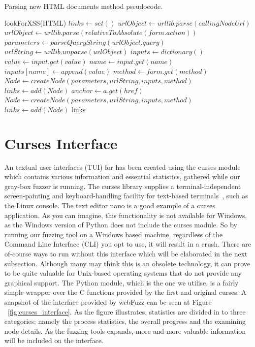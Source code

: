 \begin{algorithm}
 
 \caption{Parsing new HTML documents method pseudocode.}
 \label{alg:parser_pseudocode}
 
 \begin{algorithmic}
	\STATE lookForXSS(HTML)  
	\STATE $links \leftarrow set()$ 
 			\STATE $urlObject \leftarrow urllib.parse(callingNodeUrl)$
		 \ELSE 
 			\STATE $urlObject \leftarrow urllib.parse(relativeToAbsolute(form.action))$
		 \ENDIF
		\STATE $parameters \leftarrow parseQueryString(urlObject.query)$ 
		\STATE $urlString \leftarrow urllib.unparse(urlObject)$ 
		\STATE $inputs \leftarrow dictionary()$ 
			\STATE $value \leftarrow input.get(value)$			 
	 		\STATE $name \leftarrow input.get(name)$	
	 		\STATE $inputs[name] \leftarrow append(value)$	 
		\ENDFOR
		\STATE $method \leftarrow form.get(method)$	
		\STATE $Node \leftarrow createNode(parameters, urlString, inputs, method)$	
		\STATE $links \leftarrow add(Node)$
			\STATE $anchor \leftarrow a.get(href)$			 
		\ENDFOR
		\STATE $Node \leftarrow createNode(parameters, urlString, inputs, method)$	
		\STATE $links \leftarrow add(Node)$
	\ENDFOR
	\RETURN links
 \end{algorithmic}
\end{algorithm}

\section{Curses Interface}
An textual user interfaces (TUI) for \pname{} has been created using the curses module which contains various information and essential statistics, gathered while our gray-box fuzzer is running. The curses library supplies a terminal-independent screen-painting and keyboard-handling facility for text-based terminals~\cite{curses}, such as the Linux console. The text editor nano is a good example of a curses application. As you can imagine, this functionality is not available for Windows, as the Windows version of Python does not include the curses module. So by running our fuzzing tool on a Windows based machine, regardless of the Command Line Interface (CLI) you opt to use, it will result in a crush. There are of-course ways to run \pname{} without this interface which will be elaborated in the next subsection. Although many may think this is an obsolete technology, it can prove to be quite valuable for Unix-based operating systems that do not provide any graphical support. The Python module, which is the one we utilise, is a fairly simple wrapper over the C functions provided by the first and original curses. A snapshot of the interface provided by webFuzz can be seen at Figure ~\ref{fig:curses_interface}. As the figure illustrates, statistics are divided in to three categories; namely the process statistics, the overall progress and the examining node details.
As the fuzzing tools expands, more and more valuable information will be included on the interface.


